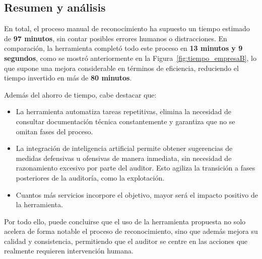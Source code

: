 \begin{parskipenv}
\subsection{Resumen y análisis}
En total, el proceso manual de reconocimiento ha supuesto un tiempo estimado de \textbf{97 minutos}, sin contar posibles errores humanos o distracciones. En comparación, la herramienta completó todo este proceso en \textbf{13 minutos y 9 segundos}, como se mostró anteriormente en la Figura~\ref{fig:tiempo_empresaB}, lo que supone una mejora considerable en términos de eficiencia, reduciendo el tiempo invertido en más de \textbf{80 minutos}.

Además del ahorro de tiempo, cabe destacar que:

\begin{itemize}
  \item La herramienta automatiza tareas repetitivas, elimina la necesidad de consultar documentación técnica constantemente y garantiza que no se omitan fases del proceso.
  
  \item La integración de inteligencia artificial permite obtener sugerencias de medidas defensivas u ofensivas de manera inmediata, sin necesidad de razonamiento excesivo por parte del auditor. Esto agiliza la transición a fases posteriores de la auditoría, como la explotación.
  
  \item Cuantos más servicios incorpore el objetivo, mayor será el impacto positivo de la herramienta.
\end{itemize}

Por todo ello, puede concluirse que el uso de la herramienta propuesta no solo acelera de forma notable el proceso de reconocimiento, sino que además mejora su calidad y consistencia, permitiendo que el auditor se centre en las acciones que realmente requieren intervención humana.

\end{parskipenv}